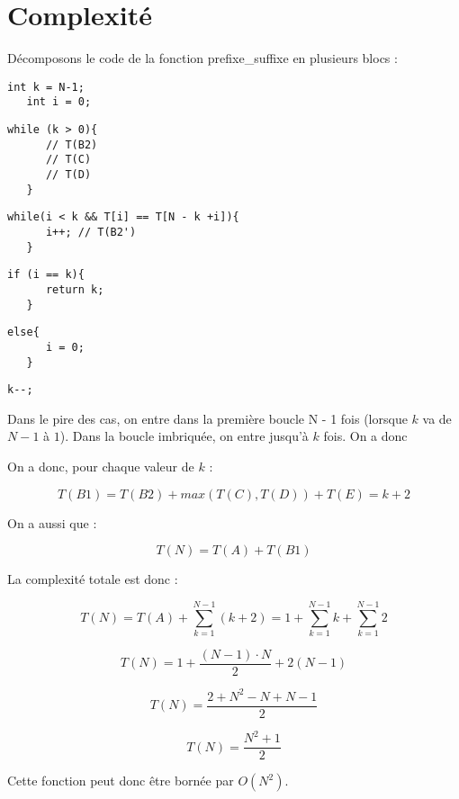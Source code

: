 \section{Complexité}\label{complexite}

Décomposons le code de la fonction prefixe\_suffixe en plusieurs blocs :
\begin{lstlisting}[caption={T(A)}]
   int k = N-1;
   int i = 0;
\end{lstlisting}

\begin{lstlisting}[caption={T(B1)}]
    while (k > 0){
      // T(B2)
      // T(C)
      // T(D)
   }
\end{lstlisting}

\begin{lstlisting}[caption={T(B2) et T(B2')}]
   while(i < k && T[i] == T[N - k +i]){
      i++; // T(B2')
   }
\end{lstlisting}

\begin{lstlisting}[caption={T(C)}]
   if (i == k){
      return k;
   }
\end{lstlisting}

\begin{lstlisting}[caption={T(D)}]
   else{
      i = 0;
   }
\end{lstlisting}

\begin{lstlisting}[caption={T(E)}]
    k--;
\end{lstlisting}

Dans le pire des cas, on entre dans la première boucle N - 1 fois 
(lorsque $k$ va de $N - 1$ à $1$).
Dans la boucle imbriquée, on entre jusqu'à $k$ fois. On a donc

On a donc, pour chaque valeur de $k$ :

\[
T(B1) = T(B2) + max(T(C), T(D)) + T(E) = k + 2
\]

On a aussi que :

\[
T(N) = T(A) + T(B1)
\]

La complexité totale est donc :

\[
T(N) = T(A) + \sum_{k = 1}^{N-1} (k + 2) = 1 + \sum_{k = 1}^{N-1} k + \sum_{k = 1}^{N-1} 2
\]

\[
T(N) = 1 + \frac{(N - 1) \cdot N}{2} + 2(N - 1)
\]

\[
T(N) = \frac{2 + N^{2} - N + N - 1}{2}
\]

\[
T(N) = \frac{N^{2} + 1}{2}
\]

Cette fonction peut donc être bornée par $O(N^2)$.
